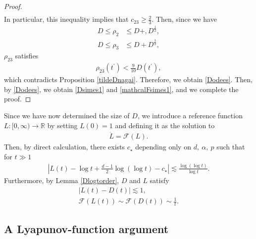 \documentclass[reqno]{amsart}
\theoremstyle{plain}
\theoremstyle{definition}
\numberwithin{equation}{section}
\newcommand{\1}{\mathbbm{1}}
\begin{document}
\begin{proof}
\begin{align*}
\end{align*}
In particular, this inequality implies that $c_{23}\geq \frac{2}{3}$. Then, since we have
\begin{align*}
D\leq \rho_2&\leq D+,D^{\frac{1}{2}},
\\
D\leq \rho_3&\leq D+D^{\frac{1}{2}},
\end{align*}
$\rho_{23}$ satisfies
\begin{align*}
\rho_{23}(t^{\prime})<\frac{9}{10}D(t^{\prime}),
\end{align*}
which contradicts Proposition \ref{tildeDnagai}. Therefore, we obtain \eqref{Dodees}. Then, by \eqref{Dodees}, we obtain  \eqref{Dsimes1} and \eqref{mathcalFsimes1}, and we complete the proof.
\end{proof}
Since we have now determined the size of $D$, we introduce a reference function $L:[0,\infty)\to\mathbb{R}$ by setting $L(0)=1$ and defining it as the solution to
\begin{align}\label{Ldef}
\dot{L}=\mathcal{F}(L).
\end{align}
Then, by direct calculation, there exists $c_{\star}$ depending only on $d,\ \alpha,\ p$ such that for $t\gg 1$
\begin{align}\label{Lesti}
\left|L(t)-\log{t}+\frac{d-1}{2}\log{(\log{t})}-c_{\star}\right|\lesssim \frac{\log{(\log{t})}}{\log{t}}.
\end{align}
Furthermore, by Lemma \ref{Dlogtorder}, $D$ and $L$ satisfy
\begin{align}
\left|L(t)-D(t)\right|\lesssim 1, \label{LDes}
\\
\mathcal{F}(L(t))\sim \mathcal{F}(D(t))\sim \frac{1}{t}. \label{mathcalFLDes}
\end{align}





\subsection{A Lyapunov-function argument}
\end{document}
